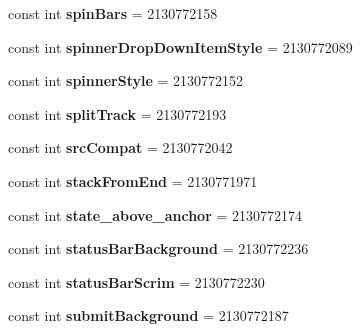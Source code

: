 \begin{DoxyCompactItemize}
const int {\bfseries spin\+Bars} = 2130772158
\item 
\mbox{\label{classXaria_1_1Resource_1_1Attribute_ac4774abe27029fd16e2c3444ddf76aae}} 
const int {\bfseries spinner\+Drop\+Down\+Item\+Style} = 2130772089
\item 
\mbox{\label{classXaria_1_1Resource_1_1Attribute_ac49a88636019d3d52328ab333598a560}} 
const int {\bfseries spinner\+Style} = 2130772152
\item 
\mbox{\label{classXaria_1_1Resource_1_1Attribute_a9fc216bb16c75c575352ef1f2f068228}} 
const int {\bfseries split\+Track} = 2130772193
\item 
\mbox{\label{classXaria_1_1Resource_1_1Attribute_a6079031ce1159d781194d7fec326550c}} 
const int {\bfseries src\+Compat} = 2130772042
\item 
\mbox{\label{classXaria_1_1Resource_1_1Attribute_ab211621e262938e88a04e9ad67a1f100}} 
const int {\bfseries stack\+From\+End} = 2130771971
\item 
\mbox{\label{classXaria_1_1Resource_1_1Attribute_a26e08c303800720ee60fa6cdd3f429e6}} 
const int {\bfseries state\+\_\+above\+\_\+anchor} = 2130772174
\item 
\mbox{\label{classXaria_1_1Resource_1_1Attribute_a75a3a643055e8a228d6d0cc79853138b}} 
const int {\bfseries status\+Bar\+Background} = 2130772236
\item 
\mbox{\label{classXaria_1_1Resource_1_1Attribute_ae8c304548b029decbe2ed8ab27a7f63d}} 
const int {\bfseries status\+Bar\+Scrim} = 2130772230
\item 
\mbox{\label{classXaria_1_1Resource_1_1Attribute_a7311908cb9912074f8cc01726221a6b2}} 
const int {\bfseries submit\+Background} = 2130772187
\item 
\mbox{\label{classXaria_1_1Resource_1_1Attribute_a40555fb74526398b6f61e2e8a5113088}} 

\end{DoxyCompactItemize}
